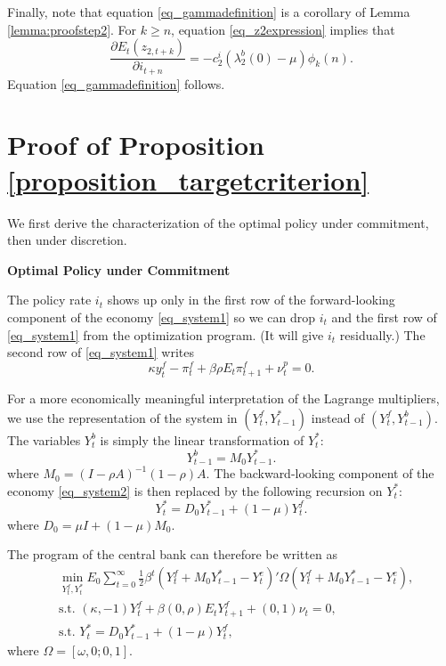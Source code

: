 Finally, note that equation \eqref{eq_gammadefinition} is a corollary of Lemma \ref{lemma:proofstep2}. For $k\geq n$, equation \eqref{eq_z2expression} implies that
\begin{equation}
\frac{\partial E_t(z_{2,t+k})}{\partial i_{t+n}} = -c_2^i (\lambda^b_2(0)-\mu) \phi_k(n).
\end{equation}
Equation \eqref{eq_gammadefinition} follows.

\section{Proof of Proposition \ref{proposition_targetcriterion}}\label{appendix_targetcriterion}
We first derive the characterization of the optimal policy under commitment, then under discretion.

\noindent \textbf{Optimal Policy under Commitment}

The policy rate $i_t$ shows up only in the first row of the forward-looking component of the economy \eqref{eq_system1} so we can drop $i_t$ and the first row of \eqref{eq_system1} from the optimization program. (It will give $i_t$ residually.) The second row of \eqref{eq_system1} writes
\begin{equation}
\label{eq:uni_lag}
\kappa y^f_t-\pi^f_t+\beta\rho E_t \pi^f_{t+1}+\nu_t^p=0.
\end{equation}

For a more economically meaningful interpretation of the Lagrange multipliers, we use the representation of the system in $(Y^f_t,Y_{t-1}^*)$ instead of $(Y^f_t,Y^b_{t-1})$. The variables $Y^b_{t}$ is simply the linear transformation of $Y_t^*$:
\begin{equation}
Y^b_{t-1} = M_0 Y_{t-1}^*.
\end{equation}
where $M_0 = (I-\rho A)^{-1}(1-\rho) A$. The backward-looking component of the economy \eqref{eq_system2} is then replaced by the following recursion on $Y_t^*$:
\begin{equation}
Y_t^* = D_0 Y_{t-1}^* + (1-\mu) Y^f_t.\label{eq_Ystar}
\end{equation}
where $D_0 = \mu I +(1-\mu) M_0$.

The program of the central bank can therefore be written as
\begin{align}
&\min_{Y^f_t,Y_{t}^*} E_0 \sum_{t=0}^{\infty} \frac{1}{2} \beta^t (Y^f_t+M_0Y_{t-1}^*-Y_t^e)'\Omega (Y^f_t+M_0Y_{t-1}^*-Y_t^e),\\
&\text{s.t. } (\kappa,-1)Y^f_t+\beta(0,\rho)E_tY^f_{t+1}+(0,1)\nu_t=0,\label{constraint_forward}\\
&\text{s.t. } Y_t^* = D_0 Y_{t-1}^* + (1-\mu) Y^f_t,\label{constraint_backward}
\end{align}
where $\Omega = [\omega,0;0,1]$. 

